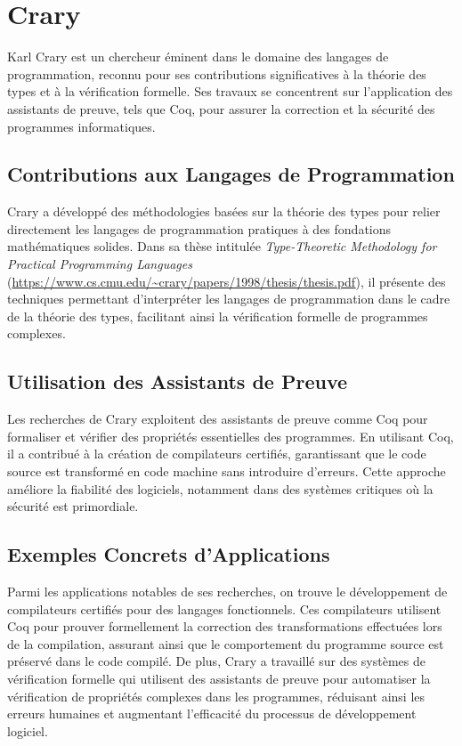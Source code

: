 \section{Crary}
Karl Crary est un chercheur éminent dans le domaine des langages de programmation, reconnu pour ses contributions significatives à la théorie des types et à la vérification formelle. Ses travaux se concentrent sur l'application des assistants de preuve, tels que Coq, pour assurer la correction et la sécurité des programmes informatiques.

\subsection{Contributions aux Langages de Programmation}
Crary a développé des méthodologies basées sur la théorie des types pour relier directement les langages de programmation pratiques à des fondations mathématiques solides. Dans sa thèse intitulée \textit{Type-Theoretic Methodology for Practical Programming Languages} (\url{https://www.cs.cmu.edu/~crary/papers/1998/thesis/thesis.pdf}), il présente des techniques permettant d'interpréter les langages de programmation dans le cadre de la théorie des types, facilitant ainsi la vérification formelle de programmes complexes.

\subsection{Utilisation des Assistants de Preuve}
Les recherches de Crary exploitent des assistants de preuve comme Coq pour formaliser et vérifier des propriétés essentielles des programmes. En utilisant Coq, il a contribué à la création de compilateurs certifiés, garantissant que le code source est transformé en code machine sans introduire d'erreurs. Cette approche améliore la fiabilité des logiciels, notamment dans des systèmes critiques où la sécurité est primordiale.

\subsection{Exemples Concrets d'Applications}
Parmi les applications notables de ses recherches, on trouve le développement de compilateurs certifiés pour des langages fonctionnels. Ces compilateurs utilisent Coq pour prouver formellement la correction des transformations effectuées lors de la compilation, assurant ainsi que le comportement du programme source est préservé dans le code compilé. De plus, Crary a travaillé sur des systèmes de vérification formelle qui utilisent des assistants de preuve pour automatiser la vérification de propriétés complexes dans les programmes, réduisant ainsi les erreurs humaines et augmentant l'efficacité du processus de développement logiciel.


